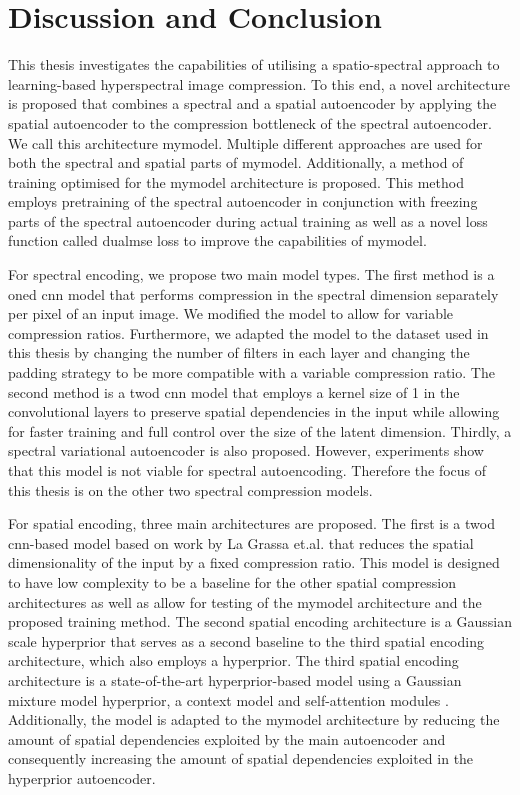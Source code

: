 \chapter{Discussion and Conclusion\label{cha:chapter6}}
This thesis investigates the capabilities of utilising a spatio-spectral approach to learning-based hyperspectral image compression. To this end, a novel architecture is proposed that combines a spectral and a spatial autoencoder by applying the spatial autoencoder to the compression bottleneck of the spectral autoencoder. We call this architecture \ac{mymodel}. Multiple different approaches are used for both the spectral and spatial parts of \ac{mymodel}. Additionally, a method of training optimised for the \ac{mymodel} architecture is proposed. This method employs pretraining of the spectral autoencoder in conjunction with freezing parts of the spectral autoencoder during actual training as well as a novel loss function called \ac{dualmse} loss to improve the capabilities of \ac{mymodel}.

For spectral encoding, we propose two main model types. The first method is a \ac{oned} \ac{cnn} model \citep{kuester_1d-convolutional_2021,kuester_transferability_2022} that performs compression in the spectral dimension separately per pixel of an input image. We modified the model to allow for variable compression ratios. Furthermore, we adapted the model to the dataset used in this thesis by changing the number of filters in each layer and changing the padding strategy to be more compatible with a variable compression ratio. The second method is a \ac{twod} \ac{cnn} model that employs a kernel size of 1 in the convolutional layers to preserve spatial dependencies in the input while allowing for faster training and full control over the size of the latent dimension. Thirdly, a spectral variational autoencoder is also proposed. However, experiments show that this model is not viable for spectral autoencoding. Therefore the focus of this thesis is on the other two spectral compression models.

For spatial encoding, three main architectures are proposed. The first is a \ac{twod} \ac{cnn}-based model based on work by La Grassa et.al. \citep{la_grassa_hyperspectral_2022} that reduces the spatial dimensionality of the input by a fixed compression ratio. This model is designed to have low complexity to be a baseline for the other spatial compression architectures as well as allow for testing of the \ac{mymodel} architecture and the proposed training method. The second spatial encoding architecture is a Gaussian scale hyperprior \citep{balle_variational_2018} that serves as a second baseline to the third spatial encoding architecture, which also employs a hyperprior.
The third spatial encoding architecture is a state-of-the-art hyperprior-based model using a Gaussian mixture model hyperprior, a context model and self-attention modules \citep{cheng_learned_2020}. Additionally, the model is adapted to the \ac{mymodel} architecture by reducing the amount of spatial dependencies exploited by the main autoencoder and consequently increasing the amount of spatial dependencies exploited in the hyperprior autoencoder.

